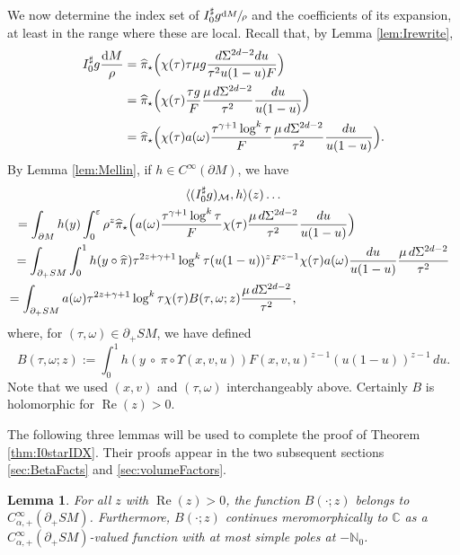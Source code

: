 \documentclass[JEP,XML,SOM,Unicode,NoFloatCountersInSection, NoEqCountersInSection,published]{cedram}
\let\cal\mathcal
\DeclareMathOperator{\Real}{Re}
\theoremstyle{plain}
\newtheorem{Lemma}[Theorem]{Lemma}
\theoremstyle{definition}
\theoremstyle{remark}
\def\Cm{{\mathbb{C}}}
\def\Nm{{\mathbb{N}}}
\newcommand{\adj}{I_0^\sharp}
\newcommand{\hpi}{\widehat{\pi}}
\newcommand {\dM}{\mathrm{d}M}
\begin{document}
We now determine the index set of $\adj g \sfrac{\dM}{\rho}$ and the coefficients of its expansion, at least in the range where these are local. Recall that, by Lemma \ref{lem:Irewrite},
\begin{align*}
\adj g \frac{\dM}{\rho} &= \hpi_\star \Bigl(\chi(\tau) \tau \mu g \frac{d\Sigma^{2d-2} du}{\tau^2 u(1-u) F} \Bigr) \\
&= \hpi_\star \Bigl(\chi(\tau) \frac{\tau g}{F} \frac{\mu \, d\Sigma^{2d-2}}{\tau^2} \frac{du}{u(1-u)} \Bigr) \\
&= \hpi_\star \Bigl(\chi(\tau)a(\omega) \frac{\tau^{\gamma+1} \log^k \tau}{F} \frac{\mu \, d\Sigma^{2d-2}}{\tau^2} \frac{du}{u(1-u)} \Bigr).
\end{align*}
By Lemma \ref{lem:Mellin}, if $h\in C^\infty(\partial M)$, we have
\begin{multline}\label{eq:calculation}
\langle (\adj g)_{\cal M}, h \rangle (z) \ldots\\
\hspace*{-2.6cm}= \int_{\partial M} h(y) \int_0^\varepsilon \rho^z \hpi_\star
\Bigl(a(\omega) \frac{\tau^{\gamma+1} \log^k \tau}{F} \chi(\tau) \frac{\mu \, d\Sigma^{2d-2}}{\tau^2} \frac{du}{u(1-u)} \Bigr) \\
= \int_{\partial_+ SM} \int_0^1 h(y\circ \hpi) \tau^{2z+\gamma+1} \log^k \tau (u(1-u))^z F^{z-1} \chi(\tau) a(\omega) \frac{du}{u(1-u)} \frac{\mu \, d\Sigma^{2d-2}}{\tau^2} \\
= \int_{\partial_+ SM} a(\omega) \tau^{2z+\gamma+1} \log^k\tau \chi(\tau) B(\tau,\omega; z) \frac{\mu \, d\Sigma^{2d-2}}{\tau^2},\hspace*{4.5cm}
\end{multline}
where, for $(\tau,\omega)\in \partial_+ SM$, we have defined
\begin{equation}
B(\tau,\omega; z) := \int_0^1 h(y\ \circ\ \pi\circ\Upsilon(x,v,u)) F(x,v,u)^{z-1} (u(1-u))^{z-1}\,du.
\label{eq:B}
\end{equation}
Note that we used $(x,v)$ and $(\tau,\omega)$ interchangeably above. Certainly $B$ is holomorphic for $\Real(z)>0$.

The following three lemmas will be used to complete the proof of Theorem \ref{thm:I0starIDX}.
Their proofs appear in the two subsequent sections \ref{sec:BetaFacts} and \ref{sec:volumeFactors}.

\begin{Lemma}
\label{lem:B}
For all $z$ with $\Real(z)>0$, the function $B(\cdot; z)$ belongs to $C_{\alpha,+}^\infty(\partial_+ SM)$. Furthermore,
$B(\cdot; z)$ continues meromorphically to $\Cm$ as a $C_{\alpha,+}^\infty(\partial_+ SM)$-valued function with at most simple poles at $-\Nm_0$.
\end{Lemma}
\end{document}
